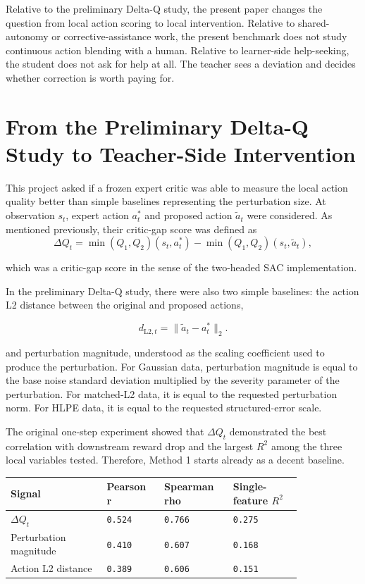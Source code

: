 \documentclass[11pt]{article}
\begin{document}
 Relative to the preliminary Delta-Q study, the present paper changes the question from local action scoring to local intervention. Relative to shared-autonomy or corrective-assistance work, the present benchmark does not study continuous action blending with a human. Relative to learner-side help-seeking, the student does not ask for help at all. The teacher sees a deviation and decides whether correction is worth paying for.

\section{From the Preliminary Delta-Q Study to Teacher-Side Intervention}

This project asked if a frozen expert critic was able to measure the local action quality better than simple baselines representing the perturbation size. At observation \(s_t\), expert action \(a_t^\ast\) and proposed action \(\tilde{a}_t\) were considered. As mentioned previously, their critic-gap score was defined as
\[
\Delta Q_t = \min(Q_1, Q_2)(s_t, a_t^\ast) - \min(Q_1, Q_2)(s_t, \tilde{a}_t),
\]

which was a critic-gap score in the sense of the two-headed SAC implementation.

In the preliminary Delta-Q study, there were also two simple baselines: the action L2 distance between the original and proposed actions,

\[
d_{\mathrm{L2},t} = \lVert \tilde{a}_t - a_t^\ast \rVert_2.
\]

and perturbation magnitude, understood as the scaling coefficient used to produce the perturbation. For Gaussian data, perturbation magnitude is equal to the base noise standard deviation multiplied by the severity parameter of the perturbation. For matched-L2 data, it is equal to the requested perturbation norm. For HLPE data, it is equal to the requested structured-error scale. 

The original one-step experiment showed that \(\Delta Q_t\) demonstrated the best correlation with downstream reward drop and the largest \(R^2\) among the three local variables tested. Therefore, Method 1 starts already as a decent baseline.

\begin{table}[h]
\centering
\small
\begin{tabular}{>{\raggedright\arraybackslash}p{0.28\linewidth}>{\raggedright\arraybackslash}p{0.16\linewidth}>{\raggedright\arraybackslash}p{0.18\linewidth}>{\raggedright\arraybackslash}p{0.20\linewidth}}
\toprule
Signal & Pearson r & Spearman rho & Single-feature \(R^2\) \\
\midrule
\(\Delta Q_t\) & \texttt{0.524} & \texttt{0.766} & \texttt{0.275} \\
Perturbation magnitude & \texttt{0.410} & \texttt{0.607} & \texttt{0.168} \\
Action L2 distance & \texttt{0.389} & \texttt{0.606} & \texttt{0.151} \\
\bottomrule
\end{tabular}
\end{table}
\end{document}
